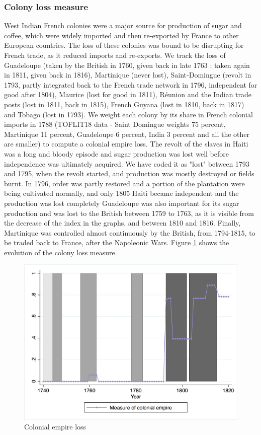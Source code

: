 \documentclass[12pt,a4paper,notitlepage,english]{article}
\begin{document}
\subsubsection{Colony loss measure}
West Indian French colonies were a major source for production of sugar and coffee, which were widely imported and then re-exported by France to other European countries. The loss of these colonies was bound to be disrupting for French trade, as it reduced imports and re-exports. 
We track the loss of Guadeloupe (taken by the British in 1760, given back in late 1763 ; taken again in 1811, given back in 1816), Martinique (never lost), Saint-Domingue (revolt in 1793, partly integrated back to the French trade network in 1796, independent for good after 1804), Maurice (lost for good in 1811), Réunion and the Indian trade posts (lost in 1811, back in 1815), French Guyana (lost in 1810, back in 1817) and Tobago (lost in 1793). We weight each colony by its share in French colonial imports in 1788 (TOFLIT18 data - Saint Domingue weights 75 percent, Martinique 11 percent, Guadeloupe 6 percent, India 3 percent and all the other are smaller) to compute a colonial empire loss. 
The revolt of the slaves in Haiti was a long and bloody episode and sugar production was lost well before independence was ultimately acquired.
We have coded it as "lost" between 1793 and 1795, when the revolt started, and production was mostly destroyed or fields burnt.
In 1796, order was partly restored and a portion of the plantation were being cultivated normally, and only 1805 Haiti became independent and the production was lost completely
Guadeloupe was also important for its sugar production and was lost to the British between 1759 to 1763, as it is visible from the decrease of the index in the graphs, and between 1810 and 1816.
Finally, Martinique was controlled almost continuously by the British, from 1794-1815, to be traded back to France, after the Napoleonic Wars.
Figure \ref{colony_loss} shows the evolution of the colony loss measure.
\begin{center}
\begin{figure}[H]
\caption{Colonial empire loss}
\label{colony_loss}
\centering
\includegraphics[scale=.51]{colony_loss.png}
\end{figure}
\end{center}
\end{document}
